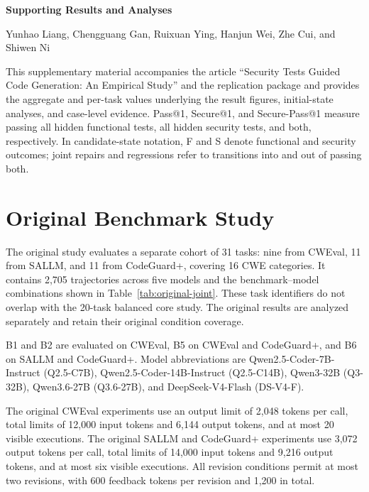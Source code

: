 \documentclass[a4paper,fleqn]{cas-sc}
\begin{document}
\begin{center}
{\Large\bfseries Supporting Results and Analyses\par}
\medskip
Yunhao Liang, Chengguang Gan, Ruixuan Ying, Hanjun Wei, Zhe Cui, and Shiwen Ni
\end{center}
This supplementary material accompanies the article ``Security Tests Guided Code Generation: An Empirical Study'' and the replication package and provides the aggregate and per-task values underlying the result figures, initial-state analyses, and case-level evidence. Pass@1, Secure@1, and Secure-Pass@1 measure passing all hidden functional tests, all hidden security tests, and both, respectively. In candidate-state notation, F and S denote functional and security outcomes; joint repairs and regressions refer to transitions into and out of passing both.
\section{Original Benchmark Study}

The original study evaluates a separate cohort of 31 tasks: nine from CWEval, 11 from SALLM, and 11 from CodeGuard+, covering 16 CWE categories. It contains 2,705 trajectories across five models and the benchmark--model combinations shown in Table~\ref{tab:original-joint}. These task identifiers do not overlap with the 20-task balanced core study. The original results are analyzed separately and retain their original condition coverage.

B1 and B2 are evaluated on CWEval, B5 on CWEval and CodeGuard+, and B6 on SALLM and CodeGuard+. Model abbreviations are Qwen2.5-Coder-7B-Instruct (Q2.5-C7B), Qwen2.5-Coder-14B-Instruct (Q2.5-C14B), Qwen3-32B (Q3-32B), Qwen3.6-27B (Q3.6-27B), and DeepSeek-V4-Flash (DS-V4-F).

\begin{table}[pos=htbp]
\caption{Original benchmark results: Secure-Pass@1 (\%) by benchmark, model, and condition. Dashes indicate conditions not evaluated in this study. These results use the original 31-task cohort; the main paper uses the complete 20-task balanced comparison.}
\label{tab:original-joint}
\centering
\resizebox{\textwidth}{!}{}
\end{table}

The original CWEval experiments use an output limit of 2,048 tokens per call, total limits of 12,000 input tokens and 6,144 output tokens, and at most 20 visible executions. The original SALLM and CodeGuard+ experiments use 3,072 output tokens per call, total limits of 14,000 input tokens and 9,216 output tokens, and at most six visible executions. All revision conditions permit at most two revisions, with 600 feedback tokens per revision and 1,200 in total.
\end{document}
